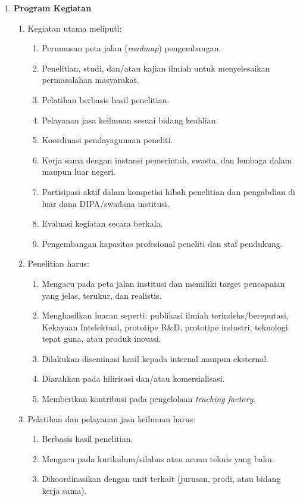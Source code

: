 \documentclass[12pt,a4paper]{article}
\begin{document}
\begin{enumerate}[leftmargin=*]
    \item \textbf{Program Kegiatan}
          \begin{enumerate}
              \item Kegiatan utama meliputi:
                    \begin{enumerate}
                        \item Perumusan peta jalan (\textit{roadmap}) pengembangan.
                        \item Penelitian, studi, dan/atau kajian ilmiah untuk menyelesaikan permasalahan masyarakat.
                        \item Pelatihan berbasis hasil penelitian.
                        \item Pelayanan jasa keilmuan sesuai bidang keahlian.
                        \item Koordinasi pendayagunaan peneliti.
                        \item Kerja sama dengan instansi pemerintah, swasta, dan lembaga dalam maupun luar negeri.
                        \item Partisipasi aktif dalam kompetisi hibah penelitian dan pengabdian di luar dana DIPA/swadana institusi.
                        \item Evaluasi kegiatan secara berkala.
                        \item Pengembangan kapasitas profesional peneliti dan staf pendukung.
                    \end{enumerate}
              \item Penelitian harus:
                    \begin{enumerate}
                        \item Mengacu pada peta jalan institusi dan memiliki target pencapaian yang jelas, terukur, dan realistis.
                        \item Menghasilkan luaran seperti: publikasi ilmiah terindeks/bereputasi, Kekayaan Intelektual, prototipe R\&D, prototipe industri, teknologi tepat guna, atau produk inovasi.
                        \item Dilakukan diseminasi hasil kepada internal maupun eksternal.
                        \item Diarahkan pada hilirisasi dan/atau komersialisasi.
                        \item Memberikan kontribusi pada pengelolaan \textit{teaching factory}.
                    \end{enumerate}
              \item Pelatihan dan pelayanan jasa keilmuan harus:
                    \begin{enumerate}
                        \item Berbasis hasil penelitian.
                        \item Mengacu pada kurikulum/silabus atau acuan teknis yang baku.
                        \item Dikoordinasikan dengan unit terkait (jurusan, prodi, atau bidang kerja sama).
                    \end{enumerate}
          \end{enumerate}


\end{enumerate}
\end{document}
